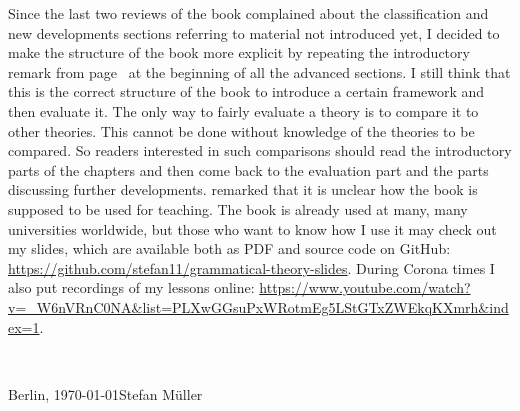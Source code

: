 Since the last two reviews of the book complained about the classification and new developments
sections referring to material not introduced yet, I decided to make the structure of the book more
explicit by repeating the introductory remark from page~\pageref{page:structure-of-book} at the
beginning of all the advanced sections. I still think that this is the correct structure of the book to introduce a
certain framework and then evaluate it. The only way to fairly evaluate a theory is to compare it to
other theories. This cannot be done without knowledge of the theories to be compared. So readers
interested in such comparisons should read the introductory parts of the chapters and then come back
to the evaluation part and the parts discussing further developments. \citet{Culicover2021a}
remarked that it is unclear how the book is supposed to be used for teaching. The book is already
used at many, many universities worldwide, but those who want to know how I use it may check out my
slides, which are available both as PDF and source code on GitHub:
\url{https://github.com/stefan11/grammatical-theory-slides}. During Corona times I also put
recordings of my lessons online: \url{https://www.youtube.com/watch?v=_W6nVRnC0NA&list=PLXwGGsuPxWRotmEg5LStGTxZWEkqKXmrh&index=1}.

~\medskip

\noindent
Berlin, \today\hfill Stefan Müller



